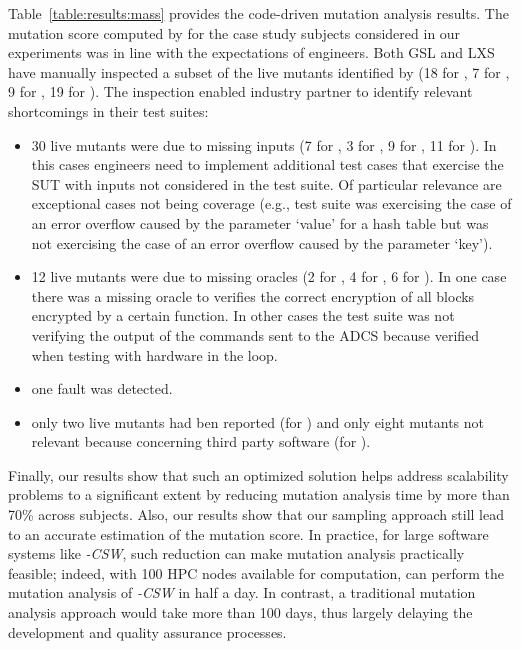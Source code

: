 Table~\ref{table:results:mass} provides the code-driven mutation analysis results. The mutation score computed by \MASS for the case study subjects considered in our experiments was in line with the expectations of engineers. Both GSL and LXS have manually inspected a subset of the live mutants identified by \MASS (18 for \UTIL, 7 for \GCSP, 9 for \PARAM, 19 for \ESAIL). The inspection enabled industry partner to identify relevant shortcomings in their test suites: 
\begin{itemize}
\item 30 live mutants were due to missing inputs (7 for \UTIL, 3 for \GCSP, 9 for \PARAM, 11 for \ESAIL). In this cases engineers need to implement additional test cases that exercise the SUT with inputs not considered in the test suite. Of particular relevance are exceptional cases not being coverage (e.g., test suite was exercising the case of an error overflow 
caused by the parameter ‘value’ for a hash table but was not exercising the case of an error overflow caused by the parameter ‘key’).
\item 12 live mutants were due to missing oracles (2 for \UTIL, 4 for \GCSP, 6 for \ESAIL). In one case there was a missing oracle to verifies the correct encryption of all blocks encrypted by a certain function. In other cases the test suite was not verifying the output of the commands sent to the ADCS because verified when testing with hardware in the loop.
\item one fault was detected.
\item only two live mutants had ben reported (for \ESAIL) and only eight mutants not relevant because concerning third party software (for \UTIL).
\end{itemize}



Finally, our results show that such an optimized solution helps address scalability problems to a significant extent by reducing mutation analysis time by more than 70\% across subjects. 
Also, our results show that our sampling approach still lead to an accurate estimation of the mutation score. 
In practice, for large software systems like \SAIL{}\emph{-CSW}, such reduction can make mutation analysis practically feasible; indeed, with 100 HPC nodes available for computation, \APPR can perform the mutation analysis of \SAIL{}\emph{-CSW} in half a day. In contrast, a traditional mutation analysis approach would take more than 100 days, thus largely delaying the development and quality assurance processes.



